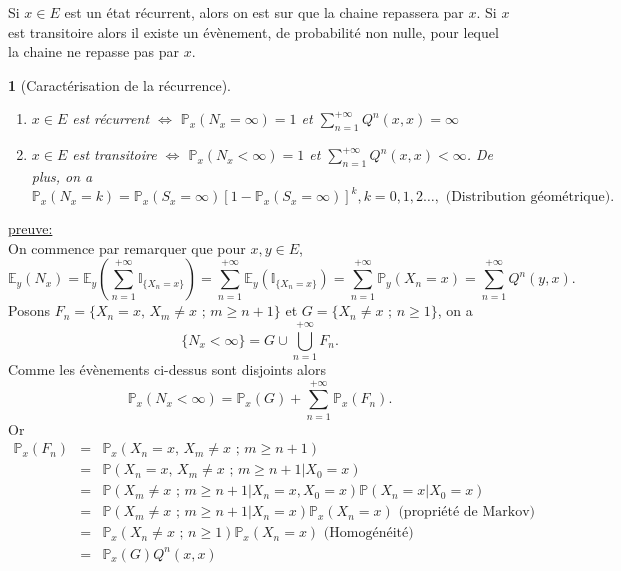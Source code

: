 \documentclass[8pt,notheorems]{beamer}
\newtheorem{theorem}{\translate{Theorem}}[section]
\newtheorem{theorem}{\translate{Theoreme}}
\theoremstyle{definition}
\theoremstyle{example}
\theoremstyle{mystyle}
\theoremstyle{plain}
\begin{document}
\begin{frame}[allowframebreaks]
Si $x\in E$ est un état récurrent, alors on est sur que la chaine repassera par $x$. Si $x$ est transitoire alors il existe un évènement, de probabilité non nulle, pour lequel la chaine ne repasse pas par $x$.
\begin{theorem}[Caractérisation de la récurrence]

\begin{enumerate}
\item $x\in E$ est récurrent $\Leftrightarrow$ $\mathbb{P}_{x}(N_x=\infty)=1$ et $\sum_{n=1}^{+\infty} Q^{n}(x,x)=\infty$
\item $x\in E$ est transitoire $\Leftrightarrow$ $\mathbb{P}_{x}(N_x<\infty)=1$ et $\sum_{n=1}^{+\infty} Q^{n}(x,x)<\infty$. De plus, on a
$$
\mathbb{P}_x(N_x=k)=\mathbb{P}_x(S_x=\infty)\left[1-\mathbb{P}_x(S_x=\infty)\right]^{k}, k=0,1,2\ldots,\text{ (Distribution géométrique)}.
$$
\end{enumerate}
\end{theorem}
\underline{preuve:}\\
On commence par remarquer que pour $x,y\in E$,
$$
\mathbb{E}_y(N_x)=\mathbb{E}_y\left(\sum_{n=1}^{+\infty}\mathbb{I}_{\{X_n=x\}}\right)=\sum_{n=1}^{+\infty}\mathbb{E}_y(\mathbb{I}_{\{X_n=x\}})=\sum_{n=1}^{+\infty}\mathbb{P}_y(X_n=x)=\sum_{n=1}^{+\infty}Q^{n}(y,x).
$$
Posons $F_{n}=\{X_n=x\text{, }X_m\neq x\text{ ; }m\geq n+1\}$ et $G=\{X_n\neq x\text{ ; }n\geq1\}$, on a
 $$
 \{N_x<\infty\}=G\cup\bigcup_{n=1}^{+\infty}F_n.
 $$
Comme les évènements ci-dessus sont disjoints alors
\begin{equation}\label{eq:PNx}
\mathbb{P}_{x}(N_x<\infty)=\mathbb{P}_{x}(G)+\sum_{n=1}^{+\infty}\mathbb{P}_{x}(F_n).
\end{equation}
Or
\begin{eqnarray*}
\mathbb{P}_{x}(F_n)&=&\mathbb{P}_{x}(X_n=x\text{, }X_m\neq x\text{ ; }m\geq n+1)\\
&=&\mathbb{P}(X_n=x\text{, }X_m\neq x\text{ ; }m\geq n+1|X_0=x)\\
&=&\mathbb{P}(X_m\neq x\text{ ; }m\geq n+1|X_n=x,X_0=x)\mathbb{P}(X_n=x|X_0=x)\\
&=&\mathbb{P}(X_m\neq x\text{ ; }m\geq n+1|X_n=x)\mathbb{P}_x(X_n=x)\text{ (propriété de Markov)}\\
&=&\mathbb{P}_x(X_n\neq x\text{ ; }n\geq 1)\mathbb{P}_x(X_n=x)\text{ (Homogénéité)}\\
&=&\mathbb{P}_x(G)Q^{n}(x,x)\\
\end{eqnarray*}

\end{frame}
\end{document}
